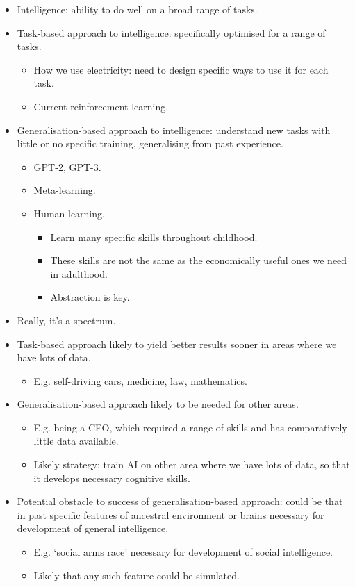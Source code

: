 \begin{itemize}
    \item Intelligence: ability to do well on a broad range of tasks.
    \item Task-based approach to intelligence: specifically optimised for a range of tasks.
    \begin{itemize}
        \item How we use electricity: need to design specific ways to use it for each task.
        \item Current reinforcement learning.
    \end{itemize}
    \item Generalisation-based approach to intelligence: understand new tasks with little or no specific training, generalising from past experience.
    \begin{itemize}
        \item GPT-2, GPT-3.
        \item Meta-learning.
        \item Human learning.
        \begin{itemize}
            \item Learn many specific skills throughout childhood.
            \item These skills are not the same as the economically useful ones we need in adulthood.
            \item Abstraction is key.
        \end{itemize}
    \end{itemize}
    \item Really, it's a spectrum.
    \item Task-based approach likely to yield better results sooner in areas where we have lots of data.
    \begin{itemize}
        \item E.g. self-driving cars, medicine, law, mathematics.
    \end{itemize}
    \item Generalisation-based approach likely to be needed for other areas.
    \begin{itemize}
        \item  E.g. being a CEO, which required a range of skills and has comparatively little data available.
        \item Likely strategy: train AI on other area where we have lots of data, so that it develops necessary cognitive skills.
    \end{itemize}
    \item Potential obstacle to success of generalisation-based approach: could be that in past specific features of ancestral environment or    brains necessary for development of general intelligence.
    \begin{itemize}
        \item E.g. `social arms race' necessary for development of social intelligence.
        \item Likely that any such feature could be simulated.
    \end{itemize}    
\end{itemize}